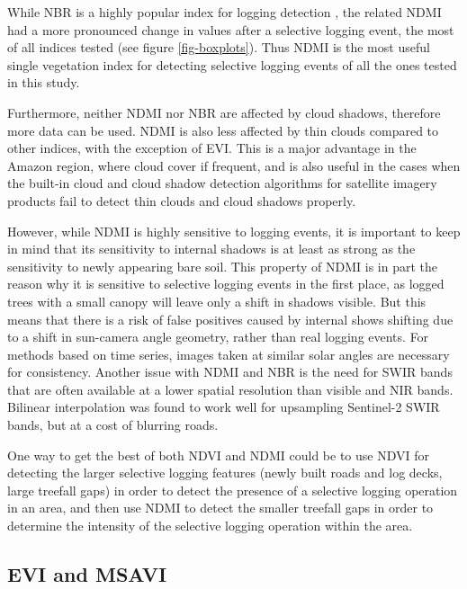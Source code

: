 \documentclass[a4paper,12pt]{scrbook}
\begin{document}
While \ac{NBR} is a highly popular index for logging detection \citep{shimizu_using_2017, schneibel_assessment_2017}, the related \ac{NDMI} had a more pronounced change in values after a selective logging event, the most of all indices tested (see figure \ref{fig-boxplots}). Thus \ac{NDMI} is the most useful single vegetation index for detecting selective logging events of all the ones tested in this study.

Furthermore, neither \ac{NDMI} nor \ac{NBR} are affected by cloud shadows, therefore more data can be used. \ac{NDMI} is also less affected by thin clouds compared to other indices, with the exception of \ac{EVI}. This is a major advantage in the Amazon region, where cloud cover if frequent, and is also useful in the cases when the built-in cloud and cloud shadow detection algorithms for satellite imagery products fail to detect thin clouds and cloud shadows properly.

However, while \ac{NDMI} is highly sensitive to logging events, it is important to keep in mind that its sensitivity to internal shadows is at least as strong as the sensitivity to newly appearing bare soil. This property of \ac{NDMI} is in part the reason why it is sensitive to selective logging events in the first place, as logged trees with a small canopy will leave only a shift in shadows visible. But this means that there is a risk of false positives caused by internal shows shifting due to a shift in sun-camera angle geometry, rather than real logging events. For methods based on time series, images taken at similar solar angles are necessary for consistency. Another issue with \ac{NDMI} and \ac{NBR} is the need for \ac{SWIR} bands that are often available at a lower spatial resolution than visible and \ac{NIR} bands. Bilinear interpolation was found to work well for upsampling Sentinel-2 \ac{SWIR} bands, but at a cost of blurring roads.

One way to get the best of both \ac{NDVI} and \ac{NDMI} could be to use \ac{NDVI} for detecting the larger selective logging features (newly built roads and log decks, large treefall gaps) in order to detect the presence of a selective logging operation in an area, and then use \ac{NDMI} to detect the smaller treefall gaps in order to determine the intensity of the selective logging operation within the area.

\subsection{EVI and MSAVI}
\end{document}
